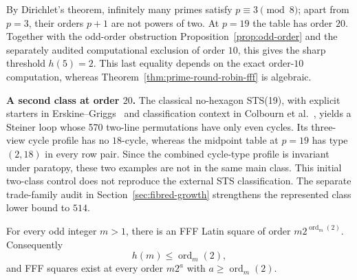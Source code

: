 By Dirichlet's theorem, infinitely many primes satisfy $p\equiv3\pmod8$;
apart from $p=3$, their orders $p+1$ are not powers of two. At $p=19$ the
table has order $20$. Together with the odd-order obstruction
Proposition~\ref{prop:odd-order} and the separately audited computational
exclusion of order $10$, this gives the
sharp threshold $h(5)=2$. This last equality depends on the exact
order-$10$ computation, whereas Theorem~\ref{thm:prime-round-robin-fff}
is algebraic.

\par\smallskip
\noindent\begin{minipage}{\linewidth}
\textbf{A second class at order $20$.}
The classical no-hexagon STS(19), with explicit starters in
Erskine--Griggs~\cite[Section 3.2]{ErskineGriggs2024CycleSwitch} and
classification context in Colbourn et al.~\cite{ColbournEtAl2010STS19}, yields a
Steiner loop whose 570 two-line permutations have only even cycles.
Its three-view cycle profile has no $18$-cycle, whereas the midpoint
table at $p=19$ has type $(2,18)$ in every row pair. Since the combined
cycle-type profile is invariant under paratopy, these two examples are
not in the same main class. This initial two-class control does not
reproduce the external STS classification. The separate trade-family
audit in Section~\ref{sec:fibred-growth} strengthens the represented
class lower bound to $514$.
\end{minipage}
\par\smallskip

\begin{theorem}
\label{thm:three-point-bound}
For every odd integer $m>1$, there is an FFF Latin square of order
$m2^{\operatorname{ord}_m(2)}$.  Consequently
\[
 h(m)\leq\operatorname{ord}_m(2),
\]
and FFF squares exist at every order $m2^a$ with
$a\geq\operatorname{ord}_m(2)$.
\end{theorem}

